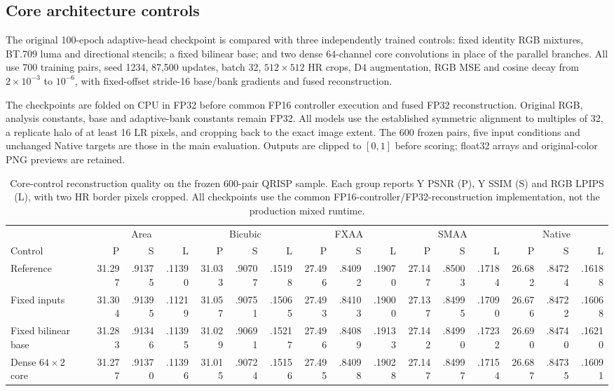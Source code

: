 \documentclass[10pt,twocolumn,letterpaper]{article}
\begin{document}
\subsection{Core architecture controls}
\label{sec:core-controls}
The original 100-epoch adaptive-head checkpoint is compared with three independently trained controls: fixed identity RGB mixtures, BT.709 luma and directional stencils; a fixed bilinear base; and two dense $64$-channel core convolutions in place of the parallel branches.
All use 700 training pairs, seed 1234, 87,500 updates, batch 32, $512\times512$ HR crops, D4 augmentation, RGB MSE and cosine decay from $2\times10^{-3}$ to $10^{-6}$, with fixed-offset stride-16 base/bank gradients and fused reconstruction.

The checkpoints are folded on CPU in FP32 before common FP16 controller execution and fused FP32 reconstruction.
Original RGB, analysis constants, base and adaptive-bank constants remain FP32.
All models use the established symmetric alignment to multiples of 32, a replicate halo of at least 16 LR pixels, and cropping back to the exact image extent.
The 600 frozen pairs, five input conditions and unchanged Native targets are those in the main evaluation.
Outputs are clipped to $[0,1]$ before scoring; float32 arrays and original-color PNG previews are retained.

\begin{table}[t]
\centering\scriptsize
\setlength{\tabcolsep}{2.5pt}
\caption{Core-control reconstruction quality on the frozen 600-pair QRISP sample. Each group reports Y PSNR (P), Y SSIM (S) and RGB LPIPS (L), with two HR border pixels cropped. All checkpoints use the common FP16-controller/FP32-reconstruction implementation, not the production mixed runtime.}
\label{tab:core-quality}
\begin{tabular}{l*{15}{r}}
\toprule
 & \multicolumn{3}{c}{Area} & \multicolumn{3}{c}{Bicubic} & \multicolumn{3}{c}{FXAA} & \multicolumn{3}{c}{SMAA} & \multicolumn{3}{c}{Native}\\
Control & P & S & L & P & S & L & P & S & L & P & S & L & P & S & L\\
\midrule
Reference &31.297&.91375&.11390&31.033&.90707&.15198&27.496&.84092&.19070&27.147&.85003&.17184&26.682&.84724&.16188\\
Fixed inputs &31.304&.91395&.11219&31.057&.90751&.15065&27.493&.84103&.19000&27.137&.84995&.17090&26.676&.84722&.16068\\
Fixed bilinear base &31.283&.91346&.11395&31.029&.90691&.15217&27.496&.84089&.19133&27.142&.84990&.17232&26.690&.84740&.16210\\
Dense $64\times2$ core &31.277&.91370&.11396&31.015&.90724&.15156&27.495&.84098&.19028&27.147&.84997&.17154&26.687&.84735&.16091\\
\bottomrule
\end{tabular}
\end{table}
\end{document}
